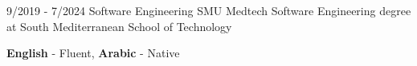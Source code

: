 \documentclass[9pt]{developercv} %
\begin{document}
\vspace{-10 pt}
\begin{entrylist}
	\entry
	{9/2019 - 7/2024}
	{Software Engineering}
	{SMU Medtech}
	{Software Engineering degree at South Mediterranean School of Technology}
\end{entrylist}

\vspace{-10 pt}
\vspace{-6pt}

\hspace{26mm} \textbf{English} - Fluent, \textbf{ Arabic} - Native

\end{document}
